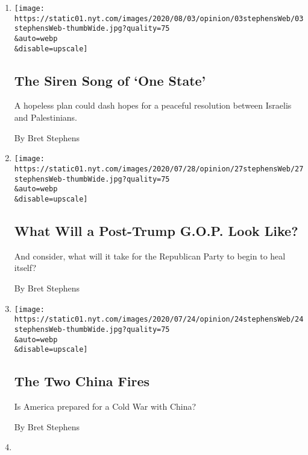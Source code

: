 \begin{enumerate}
\def\labelenumi{\arabic{enumi}.}
\item
  \href{/2020/08/03/opinion/israel-palestine-one-state-solution.html}{}

  \texttt{[image: https://static01.nyt.com/images/2020/08/03/opinion/03stephensWeb/03stephensWeb-thumbWide.jpg?quality=75\\\&auto=webp\\\&disable=upscale]}

  \hypertarget{the-siren-song-of-one-state}{%
  \subsection{The Siren Song of `One
  State'}\label{the-siren-song-of-one-state}}

  A hopeless plan could dash hopes for a peaceful resolution between
  Israelis and Palestinians.

  By Bret Stephens
\item
  \href{/2020/07/27/opinion/trump-2020.html}{}

  \texttt{[image: https://static01.nyt.com/images/2020/07/28/opinion/27stephensWeb/27stephensWeb-thumbWide.jpg?quality=75\\\&auto=webp\\\&disable=upscale]}

  \hypertarget{what-will-a-post-trump-gop-look-like}{%
  \subsection{What Will a Post-Trump G.O.P. Look
  Like?}\label{what-will-a-post-trump-gop-look-like}}

  And consider, what will it take for the Republican Party to begin to
  heal itself?

  By Bret Stephens
\item
  \href{/2020/07/24/opinion/china-trump.html}{}

  \texttt{[image: https://static01.nyt.com/images/2020/07/24/opinion/24stephensWeb/24stephensWeb-thumbWide.jpg?quality=75\\\&auto=webp\\\&disable=upscale]}

  \hypertarget{the-two-china-fires}{%
  \subsection{The Two China Fires}\label{the-two-china-fires}}

  Is America prepared for a Cold War with China?

  By Bret Stephens
\item
  \href{/2020/07/17/opinion/policing-crime-baltimore.html}{}


\end{enumerate}
